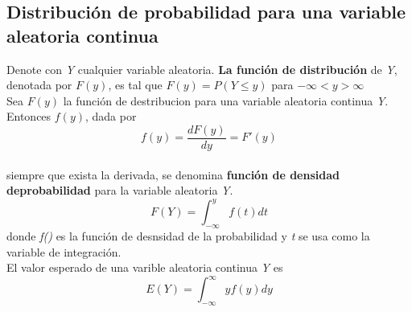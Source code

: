 \documentclass[10pt]{article}\usepackage[]{graphicx}\usepackage[]{color}
\begin{document}
\subsection{Distribución de probabilidad para una variable aleatoria continua}
Denote con \textit{Y} cualquier variable aleatoria. \textbf{La función de distribución} de \textit{Y}, denotada por $F(y)$, es tal que $F(y)=P(Y\leq y)$ para $-\infty < y >\infty$\\
Sea $F(y)$ la función de destribucion para una variable aleatoria continua \textit{Y}. Entonces $f(y)$, dada por\\
\begin{equation*}
f(y)=\frac{dF(y)}{dy}=F'(y)
\end{equation*}\\
siempre que exista la derivada, se denomina \textbf{función de densidad deprobabilidad} para la variable aleatoria \textit{Y}.
\begin{equation*}
F(Y)=\int_{-\infty}^{y}f(t)dt
\end{equation*}
donde \textit{f()} es la función de desnsidad de la probabilidad y \textit{t} se usa como la variable de integración.\\
El valor esperado de una varible aleatoria continua \textit{Y} es
\begin{equation*}
E(Y)=\int_{-\infty}^{\infty}yf(y)dy
\end{equation*}
\end{document}
